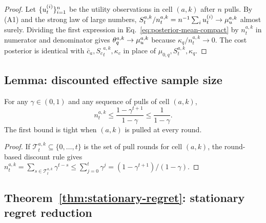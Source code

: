 \begin{proof}
Let $\{u_t^{(i)}\}_{i=1}^n$ be the utility observations in cell $(a,k)$ after
$n$ pulls. By (A1) and the strong law of large numbers,
$S^{a,k}_t/n^{a,k}_t=n^{-1}\sum_iu_t^{(i)}\to\mu_u^{a,k}$ almost surely.
Dividing the first expression in Eq.~\eqref{eq:posterior-mean-compact} by
$n^{a,k}_t$ in numerator and denominator gives
$\theta_q^{a,k}\to\mu_u^{a,k}$ because $\kappa_q/n^{a,k}_t\to0$. The cost
posterior is identical with $\bar c_a,{S_c}^{a,k}_t,\kappa_c$ in place of
$\mu_{0,q},S^{a,k}_t,\kappa_q$.
\end{proof}

\subsection{Lemma: discounted effective sample size}
\label{app:lemma-ess}

\begin{lemma}
\label{lem:ess}
For any $\gamma\in(0,1)$ and any sequence of pulls of cell $(a,k)$,
\[
n^{a,k}_t \leq \frac{1-\gamma^{t+1}}{1-\gamma}\leq\frac{1}{1-\gamma}.
\]
The first bound is tight when $(a,k)$ is pulled at every round.
\end{lemma}

\begin{proof}
If $\mathcal{T}^{a,k}_t\subseteq\{0,\ldots,t\}$ is the set of pull rounds for
cell $(a,k)$, the round-based discount rule gives
$n^{a,k}_t=\sum_{s\in\mathcal{T}^{a,k}_t}\gamma^{t-s}
\leq\sum_{j=0}^t\gamma^j=(1-\gamma^{t+1})/(1-\gamma)$.
\end{proof}

\subsection{Theorem~\ref{thm:stationary-regret}: stationary regret reduction}
\label{app:proof-stationary}

